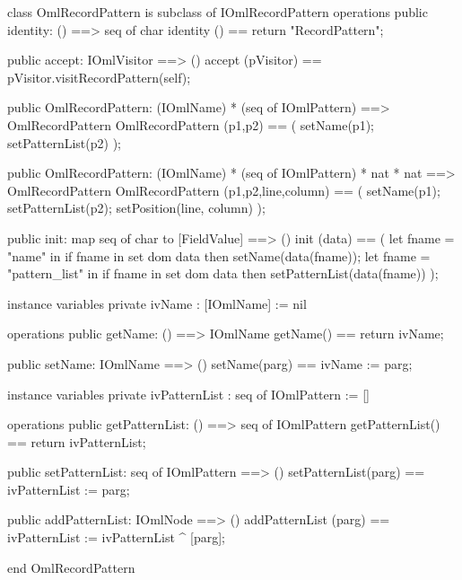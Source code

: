 \begin{vdm_al}
class OmlRecordPattern is subclass of IOmlRecordPattern
operations
  public identity: () ==> seq of char
  identity () == return "RecordPattern";

  public accept: IOmlVisitor ==> ()
  accept (pVisitor) == pVisitor.visitRecordPattern(self);

  public OmlRecordPattern:
    (IOmlName) *
    (seq of IOmlPattern) ==> OmlRecordPattern
  OmlRecordPattern (p1,p2) == 
    ( setName(p1);
      setPatternList(p2) );

  public OmlRecordPattern:
    (IOmlName) *
    (seq of IOmlPattern) *
    nat *
    nat ==> OmlRecordPattern
  OmlRecordPattern (p1,p2,line,column) == 
    ( setName(p1);
      setPatternList(p2);
      setPosition(line, column) );

  public init: map seq of char to [FieldValue] ==> ()
  init (data) ==
    ( let fname = "name" in
        if fname in set dom data
        then setName(data(fname));
      let fname = "pattern_list" in
        if fname in set dom data
        then setPatternList(data(fname)) );

instance variables
  private ivName : [IOmlName] := nil

operations
  public getName: () ==> IOmlName
  getName() == return ivName;

  public setName: IOmlName ==> ()
  setName(parg) == ivName := parg;

instance variables
  private ivPatternList : seq of IOmlPattern := []

operations
  public getPatternList: () ==> seq of IOmlPattern
  getPatternList() == return ivPatternList;

  public setPatternList: seq of IOmlPattern ==> ()
  setPatternList(parg) == ivPatternList := parg;

  public addPatternList: IOmlNode ==> ()
  addPatternList (parg) == ivPatternList := ivPatternList ^ [parg];

end OmlRecordPattern
\end{vdm_al}

